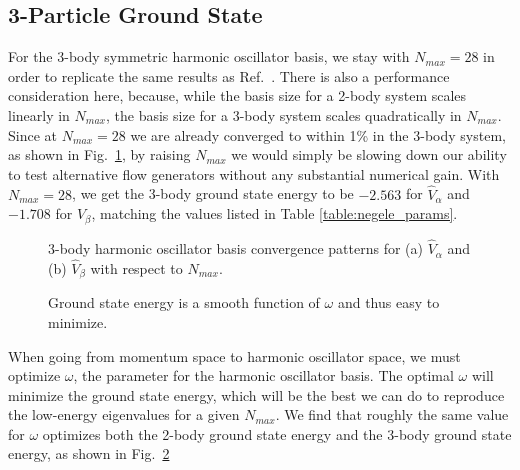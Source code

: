 \subsection{3-Particle Ground State}

For the 3-body symmetric harmonic oscillator basis, we stay with $N_{max}=28$ in order to replicate the same results as Ref.~\cite{Jurgenson:2008jp}. There is also a performance consideration here, because, while the basis size for a 2-body system scales linearly in $N_{max}$, the basis size for a 3-body system scales quadratically in $N_{max}$. Since at $N_{max}=28$ we are already converged to within 1\% in the 3-body system, as shown in Fig.~\ref{fig:3body_nmax}, by raising $N_{max}$ we would simply be slowing down our ability to test alternative flow generators without any substantial numerical gain. With $N_{max}=28$, we get the 3-body ground state energy to be $-2.563$ for $\hat{V}_\alpha$ and $-1.708$ for $\hat{V}_\beta$, matching the values listed in Table \ref{table:negele_params}.

\begin{figure}[th!]
\begin{center}
\end{center}
\caption{3-body harmonic oscillator basis convergence patterns for (a) $\hat{V}_\alpha$ and (b) $\hat{V}_\beta$ with respect to $N_{max}$.}
\label{fig:3body_nmax}
\end{figure}
\begin{figure}[th!]
\begin{center}
\end{center}
\caption{Ground state energy is a smooth function of $\omega$ and thus easy to minimize.}
\label{fig:alpha_w}
\end{figure}

When going from momentum space to harmonic oscillator space, we must optimize $\omega$, the parameter for the harmonic oscillator basis. The optimal $\omega$ will minimize the ground state energy, which will be the best we can do to reproduce the low-energy eigenvalues for a given $N_{max}$. We find that roughly the same value for $\omega$ optimizes both the 2-body ground state energy and the 3-body ground state energy, as shown in Fig.~\ref{fig:alpha_w}


